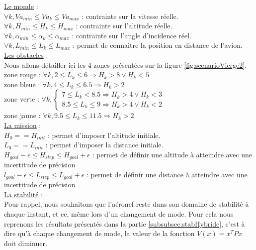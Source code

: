 	\underline{Le monde} : \\
	$\forall k, Va_{min} \leq Va_k \leq Va_{max}$ : contrainte sur la vitesse réelle.\\
	$\forall k, H_{min} \leq H_k \leq H_{max}$ : contrainte sur l'altitude réelle.\\
	$\forall k, \alpha_{min} \leq \alpha_k \leq \alpha_{max}$ : contrainte sur l'angle d'incidence réel.\\
	$\forall k, L_{min} \leq L_k \leq L_{max}$ : permet de connaitre la position en distance de l'avion.\\	
	\underline{Les obstacles} : \\
	Nous allons détailler ici les 4 zones présentées sur la figure \ref{fig:scenarioVierge2}. \\
	zone rouge : $\forall k, 2 \leq L_k \leq 6 \Rightarrow H_k > 8 \vee H_k < 5$\\
	zone bleue : $\forall k, 4 \leq L_k \leq 6.5 \Rightarrow H_k > 2$\\
	zone verte : $\forall k,   \left \{
	\begin{array}{l}
	7 \leq L_k < 8.5 \Rightarrow H_k > 4 \vee H_k < 3 \\
	8.5 \leq L_k \leq 9 \Rightarrow H_k > 4 \vee H_k < 2
	\end{array}
	\right.$\\
	zone jaune : $\forall k, 9.5 \leq L_k \leq 11.5 \Rightarrow H_k > 2$\\
	\underline{La mission} : \\
	$H_{0} == H_{init}$ : permet d'imposer l'altitude initiale.\\
	$L_{0} == L_{init}$ : permet d'imposer la distance initiale.\\
	$H_{goal} - \epsilon \leq H_{step} \leq H_{goal} + \epsilon$ : permet de définir une altitude à atteindre avec une incertitude de précision\\
	$l_{goal} - \epsilon \leq L_{step} \leq L_{goal} + \epsilon$ : permet de définir une distance à atteindre avec une incertitude de précision\\
	\underline{La stabilité} :\\
	Pour rappel, nous souhaitons que l'aéronef reste dans son domaine de stabilité à chaque instant, et ce, même lors d'un changement de mode. Pour cela nous reprenons les résultats présentés dans la partie \ref{subsubsec:stabHybride}, c'est à dire qu'à chaque changement de mode, la valeur de la fonction $V(x) = x^TPx$ doit diminuer.
	
	
